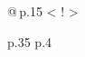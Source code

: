\documentclass[]{final_report}
\newcommand{\foo}{\makebox[0pt]{\textbullet}\hskip-0.5pt\vrule width 1pt\hspace{\labelsep}}
\begin{document}
{\begin{longtable}{@{\,}p{} <{\hskip 2pt} !{\foo} >{\raggedright\arraybackslash}p{.35\textwidth} p{.4\textwidth}}
\end{longtable}

}
\end{document}
